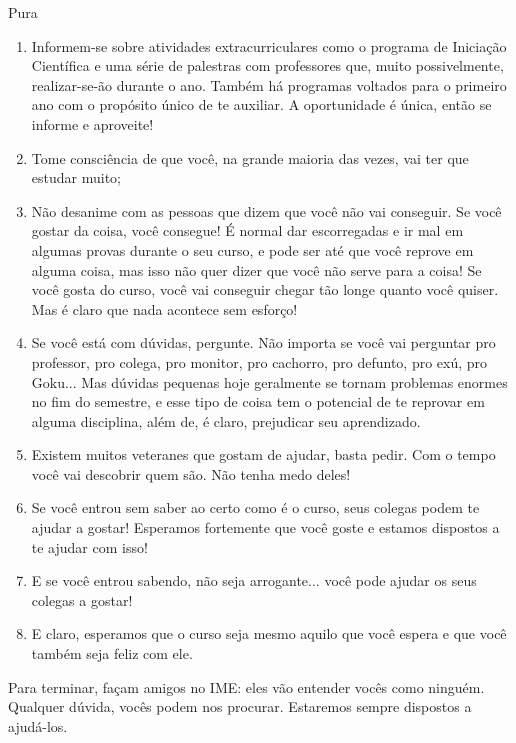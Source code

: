 \begin{subsecao}{Pura}
\begin{enumerate}
\item Informem-se sobre atividades extracurriculares como o programa de
Iniciação Científica e uma série de palestras com professores que, muito possivelmente,
realizar-se-ão durante o ano. Também há programas voltados para o primeiro ano
com o propósito único de te auxiliar. A oportunidade é única, então se informe e aproveite!
\item Tome consciência de que você, na grande maioria das vezes, vai ter que
estudar muito;
\item Não desanime com as pessoas que dizem que você não vai conseguir. Se
você gostar da coisa, você consegue! É normal dar escorregadas e ir mal em algumas
provas durante o seu curso, e pode ser até que você reprove em alguma coisa,
mas isso não quer dizer que você não serve para a coisa! Se você gosta do curso,
você vai conseguir chegar tão longe quanto você quiser. Mas é claro que nada
acontece sem esforço!
\item Se você está com dúvidas, pergunte. Não importa se você vai perguntar
pro professor, pro colega, pro monitor, pro cachorro, pro defunto, pro exú, pro
Goku... Mas dúvidas pequenas hoje geralmente se tornam problemas enormes
no fim do semestre, e esse tipo de coisa tem o potencial de te reprovar em alguma
disciplina, além de, é claro, prejudicar seu aprendizado.
\item Existem muitos veteranes que gostam de ajudar, basta pedir. Com o tempo 
você vai descobrir quem são. Não tenha medo deles!
\item Se você entrou sem saber ao certo como é o curso, seus colegas podem
te ajudar a gostar! Esperamos fortemente que você goste e estamos dispostos a te ajudar com isso!
\item E se você entrou sabendo, não seja arrogante... você pode ajudar os seus
colegas a gostar!
\item E claro, esperamos que o curso seja mesmo aquilo que você
espera e que você também seja feliz com ele.

\end{enumerate}
Para terminar, façam amigos no IME: eles vão entender vocês como ninguém. Qualquer dúvida,
vocês podem nos procurar. Estaremos sempre dispostos a ajudá-los.

\end{subsecao}
